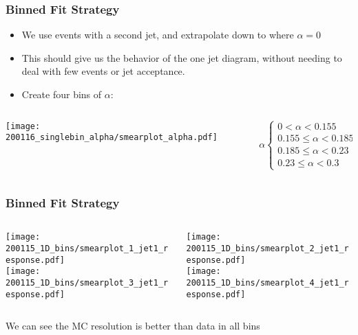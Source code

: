 \documentclass{beamer}
\begin{document}
\begin{frame}
  \frametitle{Binned Fit Strategy}

  \begin{itemize}
  \item We use events with a second jet, and extrapolate down to where $\alpha = 0$
  \item This should give us the behavior of the one jet diagram,
    without needing to deal with few events or jet acceptance.
  \item Create four bins of $\alpha$:
  \end{itemize}
  \begin{columns}
    \begin{column}{0.5\linewidth}
      \texttt{[image: 200116\_singlebin\_alpha/smearplot\_alpha.pdf]}
    \end{column}
    \begin{column}{0.5\linewidth}
      \[
      \alpha
      \begin{cases}
        0 < \alpha < 0.155 \\
        0.155 \le \alpha < 0.185 \\
        0.185 \le \alpha < 0.23 \\
        0.23 \le \alpha < 0.3
      \end{cases}
      \]
    \end{column}
  \end{columns}


\end{frame}


\begin{frame}
  \frametitle{Binned Fit Strategy}

  \begin{columns}
    \begin{column}{0.3\linewidth}
      \centering
      \texttt{[image: 200115\_1D\_bins/smearplot\_1\_jet1\_response.pdf]} \\
      \texttt{[image: 200115\_1D\_bins/smearplot\_3\_jet1\_response.pdf]}
    \end{column}
    \begin{column}{0.3\linewidth}
      \centering
      \texttt{[image: 200115\_1D\_bins/smearplot\_2\_jet1\_response.pdf]} \\
      \texttt{[image: 200115\_1D\_bins/smearplot\_4\_jet1\_response.pdf]}
    \end{column}
  \end{columns}

  \vfill
  We can see the MC resolution is better than data in all bins

\end{frame}
\end{document}

